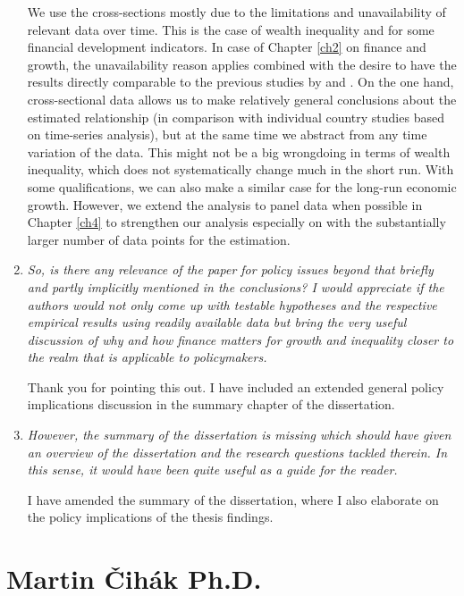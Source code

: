 \begin{enumerate}
    We use the cross-sections mostly due to the limitations and unavailability of relevant data over time. This is the case of wealth inequality and for some financial development indicators. In case of Chapter \ref{ch2} on finance and growth, the unavailability reason applies combined with the desire to have the results directly comparable to the previous studies by \textcite{Fernandezetal2001} and \textcite{SalaiMartin1997}. On the one hand, cross-sectional data allows us to make relatively general conclusions about the estimated relationship (in comparison with individual country studies based on time-series analysis), but at the same time we abstract from any time variation of the data. This might not be a big wrongdoing in terms of wealth inequality, which does not systematically change much in the short run. With some qualifications, we can also make a similar case for the long-run economic growth. However, we extend the analysis to panel data when possible in Chapter \ref{ch4} to strengthen our analysis especially on with the substantially larger number of data points for the estimation.

    \item \textit{So, is there any relevance of the paper for policy issues beyond that briefly and partly implicitly mentioned in the conclusions? I would appreciate if the authors would not only come up with testable hypotheses and the respective empirical results using readily available data but bring the very useful discussion of why and how finance matters for growth and inequality closer to the realm that is applicable to policymakers.}
    
    Thank you for pointing this out. I have included an extended general policy implications discussion in the summary chapter of the dissertation.

    \item \textit{However, the summary of the dissertation is missing which should have given an overview of the dissertation and the research questions tackled therein. In this sense, it would have been quite useful as a guide for the reader.}
    
    I have amended the summary of the dissertation, where I also elaborate on the policy implications of the thesis findings.

\end{enumerate}

\section{Martin \v{C}ih\'{a}k Ph.D.}

